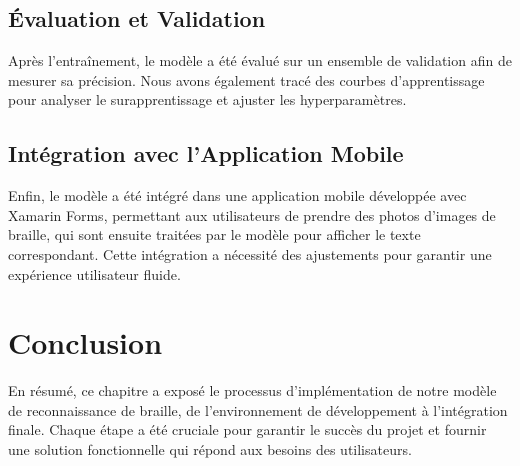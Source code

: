 \subsection{Évaluation et Validation}
Après l'entraînement, le modèle a été évalué sur un ensemble de validation afin de mesurer sa précision. Nous avons également tracé des courbes d'apprentissage pour analyser le surapprentissage et ajuster les hyperparamètres.

\subsection{Intégration avec l'Application Mobile}
Enfin, le modèle a été intégré dans une application mobile développée avec Xamarin Forms, permettant aux utilisateurs de prendre des photos d'images de braille, qui sont ensuite traitées par le modèle pour afficher le texte correspondant. Cette intégration a nécessité des ajustements pour garantir une expérience utilisateur fluide.

\section{Conclusion}
En résumé, ce chapitre a exposé le processus d'implémentation de notre modèle de reconnaissance de braille, de l'environnement de développement à l'intégration finale. Chaque étape a été cruciale pour garantir le succès du projet et fournir une solution fonctionnelle qui répond aux besoins des utilisateurs.
